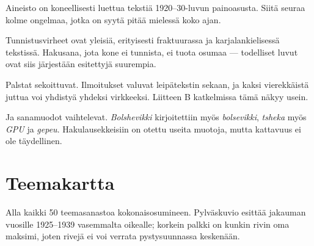 \documentclass[10pt,a4paper]{article}
\begin{document}
Aineisto on koneellisesti luettua tekstiä 1920--30-luvun painoasusta. Siitä seuraa
kolme ongelmaa, jotka on syytä pitää mielessä koko ajan.

Tunnistusvirheet ovat yleisiä, erityisesti fraktuurassa ja karjalankielisessä
tekstissä. Hakusana, jota kone ei tunnista, ei tuota osumaa --- todelliset luvut ovat
siis järjestään esitettyjä suurempia.

Palstat sekoittuvat. Ilmoitukset valuvat leipätekstin sekaan, ja kaksi vierekkäistä
juttua voi yhdistyä yhdeksi virkkeeksi. Liitteen B katkelmissa tämä näkyy usein.

Ja sanamuodot vaihtelevat. \emph{Bolshevikki} kirjoitettiin myös \emph{bolsevikki},
\emph{tsheka} myös \emph{GPU} ja \emph{gepeu}. Hakulausekkeisiin on otettu useita
muotoja, mutta kattavuus ei ole täydellinen.

\section{Teemakartta}

Alla kaikki 50 teemasanastoa kokonaisosumineen. Pylväskuvio esittää jakauman
vuosille 1925--1939 vasemmalta oikealle; korkein palkki on kunkin rivin oma
maksimi, joten rivejä ei voi verrata pystysuunnassa keskenään.
\end{document}
